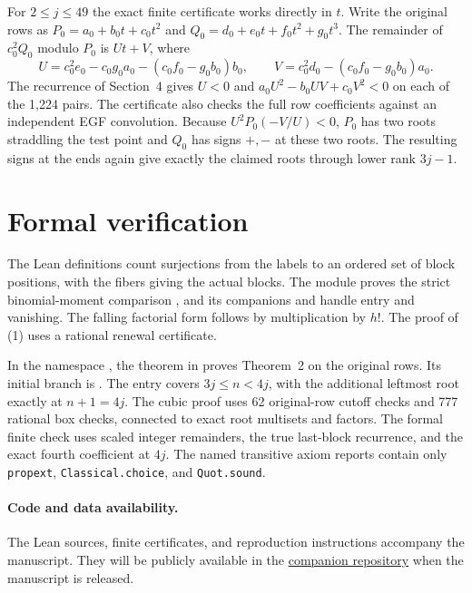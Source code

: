 \documentclass[11pt]{article}
\begin{document}
For \(2\le j\le49\) the exact finite certificate works directly in \(t\). Write the original rows as \(P_0=a_0+b_0t+c_0t^2\) and \(Q_0=d_0+e_0t+f_0t^2+g_0t^3\). The remainder of \(c_0^2Q_0\) modulo \(P_0\) is \(Ut+V\), where
\[
U=c_0^2e_0-c_0g_0a_0-(c_0f_0-g_0b_0)b_0,\qquad
V=c_0^2d_0-(c_0f_0-g_0b_0)a_0 .
\]
The recurrence of Section~4 gives \(U<0\) and \(a_0U^2-b_0UV+c_0V^2<0\) on each of the 1,224 pairs. The certificate also checks the full row coefficients against an independent EGF convolution. Because \(U^2 P_0(-V/U)<0\), \(P_0\) has two roots straddling the test point and \(Q_0\) has signs \(+,-\) at these two roots. The resulting signs at the ends again give exactly the claimed roots through lower rank \(3j-1\).



\section{Formal verification}
The Lean definitions count surjections from the labels to an ordered
set of block positions, with the fibers giving the actual blocks.
The module  proves the strict binomial-moment comparison
, and its companions
 and  handle entry and
vanishing. The falling factorial form follows by multiplication by \(h!\).
The proof of (1) uses a rational renewal certificate.

In the namespace , the theorem
 in 
proves Theorem~2 on the original rows. Its initial branch is
. The entry 
covers \(3j\le n<4j\), with the additional leftmost root exactly at
\(n+1=4j\). The cubic proof uses 62 original-row cutoff checks and 777
rational box checks, connected to exact root multisets and factors.
The formal finite check uses scaled integer remainders, the true
last-block recurrence, and the exact fourth coefficient at \(4j\).
The named transitive axiom reports contain only
\texttt{propext}, \texttt{Classical.choice}, and \texttt{Quot.sound}.

\paragraph{Code and data availability.}
The Lean sources, finite certificates, and reproduction instructions accompany
the manuscript. They will be publicly available in the
\href{https://github.com/AlexZander-666/ordered-partition-large-blocks}{companion repository}
when the manuscript is released.
\end{document}
